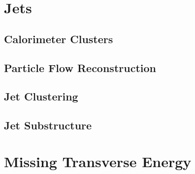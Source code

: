 \section{Jets}
\subsection{Calorimeter Clusters}
\subsection{Particle Flow Reconstruction}
\subsection{Jet Clustering}
\subsection{Jet Substructure}
\section{Missing Transverse Energy}
